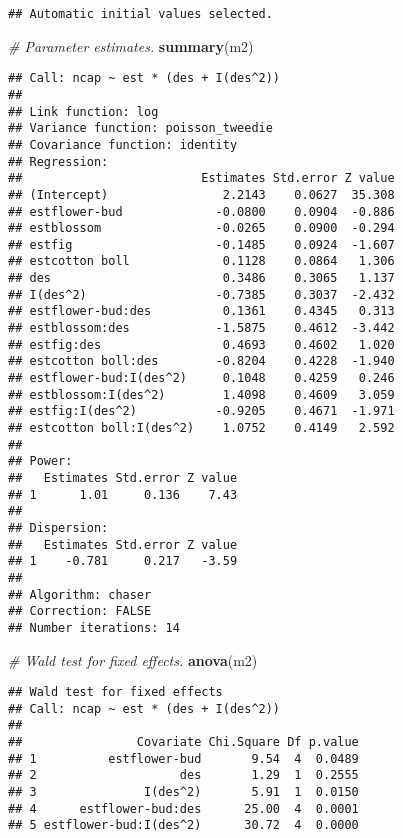 \documentclass[9pt,a5paper,]{book}
\newenvironment{Shaded}{}{}
\newcommand{\KeywordTok}[1]{\textbf{{#1}}}
\newcommand{\CommentTok}[1]{\textit{{#1}}}
\newcommand{\NormalTok}[1]{{#1}}
\renewenvironment{Shaded}{\color{inputcolor}}{}
\theoremstyle{definition}
\theoremstyle{definition}
\theoremstyle{remark}
\begin{document}
\begin{verbatim}
## Automatic initial values selected.
\end{verbatim}

\begin{Shaded}
\begin{Highlighting}[]
\CommentTok{# Parameter estimates.}
\KeywordTok{summary}\NormalTok{(m2)}
\end{Highlighting}
\end{Shaded}

\begin{verbatim}
## Call: ncap ~ est * (des + I(des^2))
## 
## Link function: log
## Variance function: poisson_tweedie
## Covariance function: identity
## Regression:
##                         Estimates Std.error Z value
## (Intercept)                2.2143    0.0627  35.308
## estflower-bud             -0.0800    0.0904  -0.886
## estblossom                -0.0265    0.0900  -0.294
## estfig                    -0.1485    0.0924  -1.607
## estcotton boll             0.1128    0.0864   1.306
## des                        0.3486    0.3065   1.137
## I(des^2)                  -0.7385    0.3037  -2.432
## estflower-bud:des          0.1361    0.4345   0.313
## estblossom:des            -1.5875    0.4612  -3.442
## estfig:des                 0.4693    0.4602   1.020
## estcotton boll:des        -0.8204    0.4228  -1.940
## estflower-bud:I(des^2)     0.1048    0.4259   0.246
## estblossom:I(des^2)        1.4098    0.4609   3.059
## estfig:I(des^2)           -0.9205    0.4671  -1.971
## estcotton boll:I(des^2)    1.0752    0.4149   2.592
## 
## Power:
##   Estimates Std.error Z value
## 1      1.01     0.136    7.43
## 
## Dispersion:
##   Estimates Std.error Z value
## 1    -0.781     0.217   -3.59
## 
## Algorithm: chaser
## Correction: FALSE
## Number iterations: 14
\end{verbatim}

\begin{Shaded}
\begin{Highlighting}[]
\CommentTok{# Wald test for fixed effects.}
\KeywordTok{anova}\NormalTok{(m2)}
\end{Highlighting}
\end{Shaded}

\begin{verbatim}
## Wald test for fixed effects
## Call: ncap ~ est * (des + I(des^2))
## 
##                Covariate Chi.Square Df p.value
## 1          estflower-bud       9.54  4  0.0489
## 2                    des       1.29  1  0.2555
## 3               I(des^2)       5.91  1  0.0150
## 4      estflower-bud:des      25.00  4  0.0001
## 5 estflower-bud:I(des^2)      30.72  4  0.0000
\end{verbatim}
\end{document}
